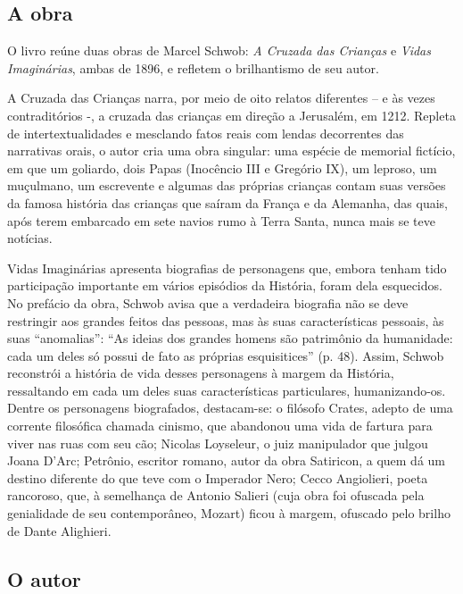 \documentclass[12pt]{extarticle}
\begin{document}
\subsection{A obra}

O livro reúne duas obras de Marcel Schwob: \emph{A Cruzada das Crianças}
e \emph{Vidas Imaginárias}, ambas de 1896, e refletem o brilhantismo de
seu autor.

A Cruzada das Crianças narra, por meio de oito relatos diferentes -- e
às vezes contraditórios -, a cruzada das crianças em direção a
Jerusalém, em 1212. Repleta de intertextualidades e mesclando fatos
reais com lendas decorrentes das narrativas orais, o autor cria uma obra
singular: uma espécie de memorial fictício, em que um goliardo, dois
Papas (Inocêncio III e Gregório IX), um leproso, um muçulmano, um
escrevente e algumas das próprias crianças contam suas versões da famosa
história das crianças que saíram da França e da Alemanha, das quais,
após terem embarcado em sete navios rumo à Terra Santa, nunca mais se
teve notícias.

Vidas Imaginárias apresenta biografias de personagens que, embora tenham
tido participação importante em vários episódios da História, foram dela
esquecidos. No prefácio da obra, Schwob avisa que a verdadeira biografia
não se deve restringir aos grandes feitos das pessoas, mas às suas
características pessoais, às suas ``anomalias'': ``As ideias dos grandes
homens são patrimônio da humanidade: cada um deles só possui de fato as
próprias esquisitices'' (p. 48). Assim, Schwob reconstrói a história de
vida desses personagens à margem da História, ressaltando em cada um
deles suas características particulares, humanizando-os. Dentre os
personagens biografados, destacam-se: o filósofo Crates, adepto de uma
corrente filosófica chamada cinismo, que abandonou uma vida de fartura
para viver nas ruas com seu cão; Nicolas Loyseleur, o juiz manipulador
que julgou Joana D'Arc; Petrônio, escritor romano, autor da obra
Satiricon, a quem dá um destino diferente do que teve com o Imperador
Nero; Cecco Angiolieri, poeta rancoroso, que, à semelhança de Antonio
Salieri (cuja obra foi ofuscada pela genialidade de seu contemporâneo,
Mozart) ficou à margem, ofuscado pelo brilho de Dante Alighieri.

\subsection{O autor}

\end{document}

